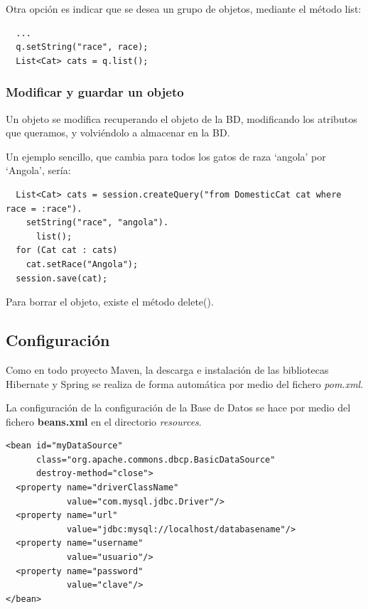 \documentclass[11pt]{article}
\begin{document}
Otra opción es indicar que se desea un grupo de objetos, mediante el método
\textsf{list}:

\begin{lstlisting}
  ...
  q.setString("race", race);
  List<Cat> cats = q.list();
\end{lstlisting}


\subsubsection{Modificar y guardar un objeto} \label{sec-6-3-2}

Un objeto se modifica recuperando el objeto de la BD, modificando los atributos
que queramos, y volviéndolo a almacenar en la BD.

Un ejemplo sencillo, que cambia para todos los gatos de raza `angola' por `Angola', sería:

\begin{lstlisting}
  List<Cat> cats = session.createQuery("from DomesticCat cat where race = :race").
    setString("race", "angola").
      list();
  for (Cat cat : cats)
    cat.setRace("Angola");
  session.save(cat);
\end{lstlisting}

Para borrar el objeto, existe el método \textsf{delete()}.


\subsection{Configuración} \label{sec-6-4} \label{cfgorm}

Como en todo proyecto Maven, la descarga e instalación de las bibliotecas Hibernate
y Spring se realiza de forma automática por medio del fichero \emph{pom.xml}.

La configuración de la configuración de la Base de Datos se hace por medio del
fichero \textbf{beans.xml} en el directorio \emph{resources}.


\begin{lstlisting}
<bean id="myDataSource"
      class="org.apache.commons.dbcp.BasicDataSource"
      destroy-method="close">
  <property name="driverClassName"
            value="com.mysql.jdbc.Driver"/>
  <property name="url"
            value="jdbc:mysql://localhost/databasename"/>
  <property name="username"
            value="usuario"/>
  <property name="password"
            value="clave"/>
</bean>
\end{lstlisting}
\end{document}
